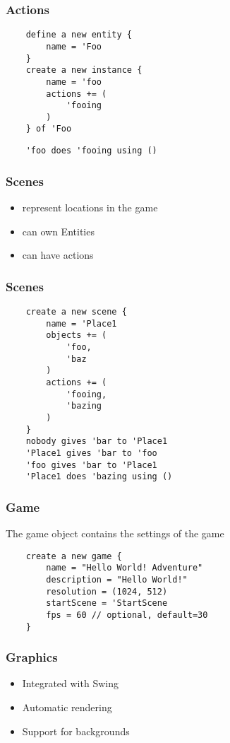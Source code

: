 \documentclass{beamer}
\begin{document}
\begin{frame}[fragile]
    \frametitle{Actions}
    \begin{lstlisting}
    define a new entity {
        name = 'Foo
    }
    create a new instance {
        name = 'foo
        actions += (
            'fooing
        )
    } of 'Foo
    \end{lstlisting}
    \pause
    \begin{lstlisting}
    'foo does 'fooing using ()
    \end{lstlisting}
\end{frame}

\begin{frame}
    \frametitle{Scenes}
    \begin{itemize}[<+->]
        \item{represent locations in the game}
        \item{can own Entities}
        \item{can have actions}
    \end{itemize}
\end{frame}

\begin{frame}[fragile]
    \frametitle{Scenes}
    \begin{lstlisting}
    create a new scene {
        name = 'Place1
        objects += (
            'foo,
            'baz
        )
        actions += (
            'fooing,
            'bazing
        )
    }
    nobody gives 'bar to 'Place1
    'Place1 gives 'bar to 'foo
    'foo gives 'bar to 'Place1
    'Place1 does 'bazing using ()
    \end{lstlisting}
\end{frame}

\begin{frame}[fragile]
    \frametitle{Game}
    The game object contains the settings of the game
    \begin{lstlisting}
    create a new game {
        name = "Hello World! Adventure"
        description = "Hello World!"
        resolution = (1024, 512)
        startScene = 'StartScene
        fps = 60 // optional, default=30
    }
    \end{lstlisting}
\end{frame}

\begin{frame}
    \frametitle{Graphics}
    \begin{itemize}[<+->]
        \item{Integrated with Swing}
        \item{Automatic rendering}
        \item{Support for backgrounds}
    \end{itemize}
\end{frame}
\end{document}

